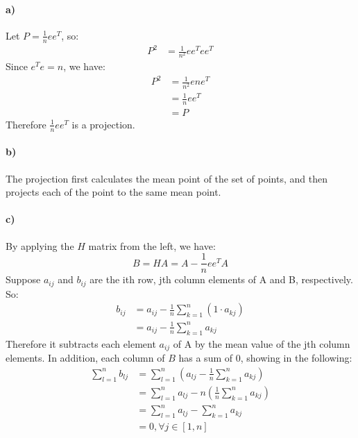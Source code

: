 \documentclass{article}
\begin{document}
\paragraph{a)} Let $P=\frac{1}{n}ee^T$, so:
\begin{align*}
P^2 &= \frac{1}{n^2}ee^Tee^T
\end{align*}
Since $e^Te=n$, we have:
\begin{align*}
P^2 &= \frac{1}{n^2}ene^T \\
&= \frac{1}{n}ee^T \\
&= P
\end{align*}
Therefore $\frac{1}{n}ee^T$ is a projection. 
\paragraph{b)}
The projection first calculates the mean point of the set of points, and then projects each of the point to the same mean point. 
\paragraph{c)}
By applying the $H$ matrix from the left, we have:
\begin{equation*}
B = HA = A - \frac{1}{n}ee^TA
\end{equation*}
Suppose $a_{ij}$ and $b_{ij}$ are the ith row, jth column elements of A and B, respectively. So:
\begin{align*}
b_{ij} &= a_{ij} - \frac{1}{n}\sum_{k=1}^{n}(1\cdot a_{kj}) \\
&=a_{ij} - \frac{1}{n}\sum_{k=1}^{n}a_{kj}
\end{align*}
Therefore it subtracts each element $a_{ij}$ of A by the mean value of the jth column elements. In addition, each column of $B$ has a sum of 0, showing in the following:
\begin{align*}
\sum_{l=1}^{n}b_{lj} &= \sum_{l=1}^{n}(a_{lj}  - \frac{1}{n}\sum_{k=1}^{n}a_{kj}) \\
&= \sum_{l=1}^{n}a_{lj} - n(\frac{1}{n}\sum_{k=1}^{n}a_{kj})\\
&= \sum_{l=1}^{n}a_{lj} - \sum_{k=1}^{n}a_{kj}\\
&=0, \forall j \in [1,n]
\end{align*}
\end{document}
